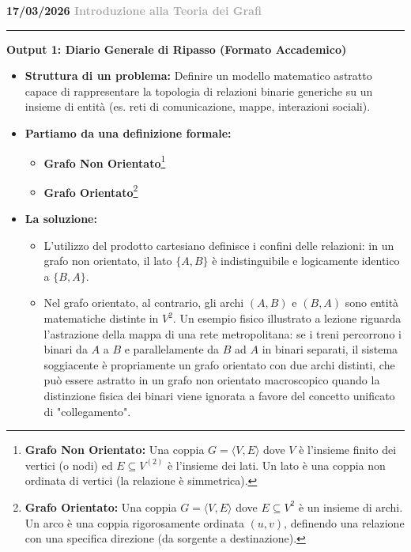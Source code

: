 \documentclass[a4paper, 11pt]{report}
\newcommand{\lezione}[2]{
\vspace{2em}
\noindent\textbf{\Large #1 \hfill \textcolor{darkgray}{#2}}
\vspace{0.5em}
\hrule
\vspace{1.5em}
}
\newcommand{\definizione}[2]{%
\textbf{#1}\footnote{\textbf{#1:} #2}%
}
\begin{document}
\lezione{17/03/2026}{Introduzione alla Teoria dei Grafi}

\vspace{0.5cm}
\textbf{Output 1: Diario Generale di Ripasso (Formato Accademico)}

\begin{itemize}
    \item \textbf{Struttura di un problema:}
    Definire un modello matematico astratto capace di rappresentare la topologia di relazioni binarie generiche su un insieme di entità (es. reti di comunicazione, mappe, interazioni sociali).

    \item \textbf{Partiamo da una definizione formale:}
    \begin{itemize}
        \item \definizione{Grafo Non Orientato}{Una coppia $G = \langle V, E \rangle$ dove $V$ è l'insieme finito dei vertici (o nodi) ed $E \subseteq V^{(2)}$ è l'insieme dei lati. Un lato è una coppia non ordinata di vertici (la relazione è simmetrica).}
        \item \definizione{Grafo Orientato}{Una coppia $G = \langle V, E \rangle$ dove $E \subseteq V^2$ è un insieme di archi. Un arco è una coppia rigorosamente ordinata $(u, v)$, definendo una relazione con una specifica direzione (da sorgente a destinazione).}
    \end{itemize}

    \item \textbf{La soluzione:}
    \begin{itemize}
        \item L'utilizzo del prodotto cartesiano definisce i confini delle relazioni: in un grafo non orientato, il lato $\{A, B\}$ è indistinguibile e logicamente identico a $\{B, A\}$.
        \item Nel grafo orientato, al contrario, gli archi $(A, B)$ e $(B, A)$ sono entità matematiche distinte in $V^2$. Un esempio fisico illustrato a lezione riguarda l'astrazione della mappa di una rete metropolitana: se i treni percorrono i binari da $A$ a $B$ e parallelamente da $B$ ad $A$ in binari separati, il sistema soggiacente è propriamente un grafo orientato con due archi distinti, che può essere astratto in un grafo non orientato macroscopico quando la distinzione fisica dei binari viene ignorata a favore del concetto unificato di "collegamento".
    \end{itemize}
\end{itemize}
\end{document}
